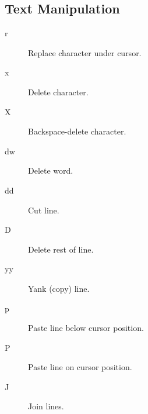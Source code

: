 \subsection{Text Manipulation}
\begin{description}
\item[r] Replace character under cursor.
\item[x] Delete character.
\item[X] Backspace-delete character.
\item[dw] Delete word.
\item[dd] Cut line.
\item[D] Delete rest of line.
\item[yy] Yank (copy) line.
\item[p] Paste line below cursor position.
\item[P] Paste line on cursor position.
\item[J] Join lines.
\end{description}
